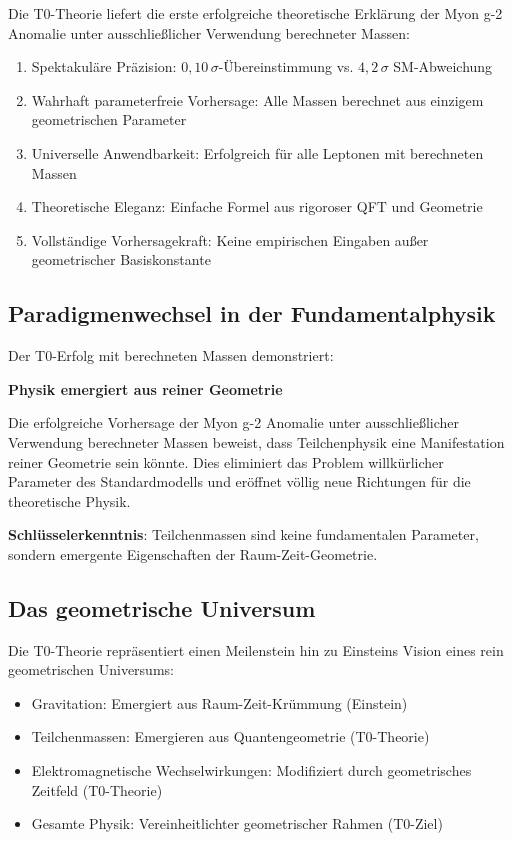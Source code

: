 \documentclass[12pt,a4paper]{article}
\numberwithin{equation}{section}
\begin{document}
	Die T0-Theorie liefert die erste erfolgreiche theoretische Erkl\"arung der Myon g-2 Anomalie unter ausschlie\ss{}licher Verwendung berechneter Massen:
	
	\begin{enumerate}
		\item Spektakul\"are Pr\"azision: $0{,}10\,\sigma$-\"Ubereinstimmung vs. $4{,}2\,\sigma$ SM-Abweichung
		\item Wahrhaft parameterfreie Vorhersage: Alle Massen berechnet aus einzigem geometrischen Parameter
		\item Universelle Anwendbarkeit: Erfolgreich f\"ur alle Leptonen mit berechneten Massen
		\item Theoretische Eleganz: Einfache Formel aus rigoroser QFT und Geometrie
		\item Vollst\"andige Vorhersagekraft: Keine empirischen Eingaben au\ss{}er geometrischer Basiskonstante
	\end{enumerate}
	
	\subsection{Paradigmenwechsel in der Fundamentalphysik}
	
	Der T0-Erfolg mit berechneten Massen demonstriert:
	
	\begin{t0erfolg}
		\textbf{Physik emergiert aus reiner Geometrie}
		
		Die erfolgreiche Vorhersage der Myon g-2 Anomalie unter ausschlie\ss{}licher Verwendung berechneter Massen beweist, dass Teilchenphysik eine Manifestation reiner Geometrie sein k\"onnte. Dies eliminiert das Problem willk\"urlicher Parameter des Standardmodells und er\"offnet v\"ollig neue Richtungen f\"ur die theoretische Physik.
		
		\textbf{Schl\"usselerkenntnis}: Teilchenmassen sind keine fundamentalen Parameter, sondern emergente Eigenschaften der Raum-Zeit-Geometrie.
	\end{t0erfolg}
	
	\subsection{Das geometrische Universum}
	
	Die T0-Theorie repr\"asentiert einen Meilenstein hin zu Einsteins Vision eines rein geometrischen Universums:
	\begin{itemize}
		\item Gravitation: Emergiert aus Raum-Zeit-Kr\"ummung (Einstein)
		\item Teilchenmassen: Emergieren aus Quantengeometrie (T0-Theorie)
		\item Elektromagnetische Wechselwirkungen: Modifiziert durch geometrisches Zeitfeld (T0-Theorie)
		\item Gesamte Physik: Vereinheitlichter geometrischer Rahmen (T0-Ziel)
	\end{itemize}
	
\end{document}
